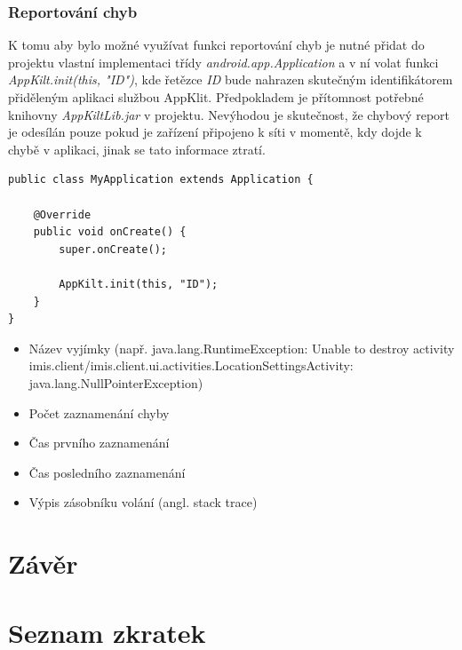 \documentclass{diplomka}
\begin{document}
\subsection*{Reportování chyb}
K tomu aby bylo možné využívat funkci reportování chyb je nutné přidat do projektu vlastní implementaci třídy \emph{android.app.Application} a v ní volat funkci \emph{AppKilt.init(this, "ID")}, kde řetězce \emph{ID} bude nahrazen skutečným identifikátorem přiděleným aplikaci službou AppKlit. Předpokladem je přítomnost potřebné knihovny \emph{AppKiltLib.jar} v projektu. Nevýhodou je skutečnost, že chybový report je odesílán pouze pokud je zařízení připojeno k síti v momentě, kdy dojde k chybě v aplikaci, jinak se tato informace ztratí. 
\begin{lstlisting}
public class MyApplication extends Application {

	@Override
	public void onCreate() {
		super.onCreate();
		
		AppKilt.init(this, "ID");
	}
}
\end{lstlisting}

\begin{itemize}[noitemsep,nolistsep]
\item Název vyjímky (např. java.lang.RuntimeException: Unable to destroy activity {imis.client/imis.client.ui.activities.LocationSettingsActivity}: \\java.lang.NullPointerException)
\item Počet zaznamenání chyby
\item Čas prvního zaznamenání
\item Čas posledního zaznamenání
\item Výpis zásobníku volání (angl. stack trace)


\end{itemize}

\chapter{Závěr}

\chapter*{Seznam zkratek} 
\end{document}
